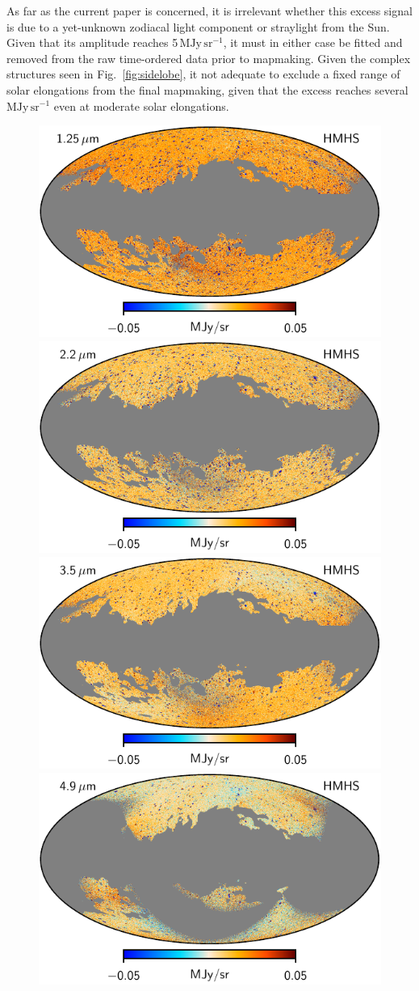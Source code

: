 \documentclass{aa}
\begin{document}
As far as the current paper is concerned, it is irrelevant whether
this excess signal is due to a yet-unknown zodiacal light component or
straylight from the Sun. Given that its amplitude reaches 5\,$\mathrm{MJy\,sr^{-1}}$,
it must in either case be fitted and removed from the raw time-ordered
data prior to mapmaking. Given the complex structures seen in
Fig.~\ref{fig:sidelobe}, it not adequate to exclude
a fixed range of solar elongations from the final mapmaking, given
that the excess reaches several $\mathrm{MJy\,sr^{-1}}$ even at moderate solar
elongations.

  \begin{figure}
  \centering
  \includegraphics[width=0.42\linewidth]{figs/dirbe_01_hmhs_v1.pdf}\hspace*{5mm}
  \includegraphics[width=0.42\linewidth]{figs/dirbe_02_hmhs_v1.pdf}\\
  \includegraphics[width=0.42\linewidth]{figs/dirbe_03_hmhs_v1.pdf}\hspace*{5mm}
  \includegraphics[width=0.42\linewidth]{figs/dirbe_04_hmhs_v1.pdf}\\

\end{figure}
\end{document}
